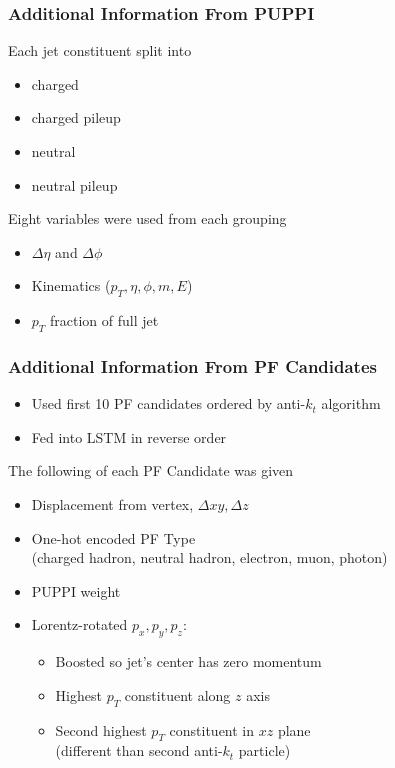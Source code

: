 \documentclass{beamer}
\begin{document}
\begin{frame}
  \frametitle{Additional Information From PUPPI}

  Each jet constituent split into

  \begin{itemize}
  \item charged
  \item charged pileup
  \item neutral
  \item neutral pileup
  \end{itemize}

  Eight variables were used from each grouping 

  \begin{itemize}
  \item $\Delta \eta$ and $\Delta \phi$
  \item Kinematics ($p_T, \eta, \phi, m, E$)
  \item $p_T$ fraction of full jet
  \end{itemize}

\end{frame}

\begin{frame}
  \frametitle{Additional Information From PF Candidates}

  \begin{itemize}
  \item Used first 10 PF candidates ordered by anti-$k_t$ algorithm
  \item Fed into LSTM in reverse order
  \end{itemize}

  The following of each PF Candidate was given

  \begin{itemize}
  \item Displacement from vertex, $\Delta xy, \Delta z$
  \item One-hot encoded PF Type \\
    (charged hadron, neutral hadron, electron, muon, photon)
  \item PUPPI weight
  \item Lorentz-rotated $p_x, p_y, p_z$:
    \begin{itemize}
    \item Boosted so jet's center has zero momentum
    \item Highest $p_T$ constituent along $z$ axis
    \item Second highest $p_T$ constituent in $xz$ plane \\
      (different than second anti-$k_t$ particle)
    \end{itemize}
  \end{itemize}

\end{frame}
\end{document}
